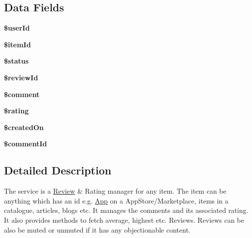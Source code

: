 \subsection*{Data Fields}
\begin{DoxyCompactItemize}
\item 
\hypertarget{class_review_a84651f4070d04080f6c5fd3c98cc9104}{{\bfseries \$user\+Id}}\label{class_review_a84651f4070d04080f6c5fd3c98cc9104}

\item 
\hypertarget{class_review_aa4c0908542b0acc0aaa0aadee3df7ae5}{{\bfseries \$item\+Id}}\label{class_review_aa4c0908542b0acc0aaa0aadee3df7ae5}

\item 
\hypertarget{class_review_a58391ea75f2d29d5d708d7050b641c33}{{\bfseries \$status}}\label{class_review_a58391ea75f2d29d5d708d7050b641c33}

\item 
\hypertarget{class_review_a20db85f30a58306b84a1edff65e1954e}{{\bfseries \$review\+Id}}\label{class_review_a20db85f30a58306b84a1edff65e1954e}

\item 
\hypertarget{class_review_a536677acc0163c53c067316a97456e6c}{{\bfseries \$comment}}\label{class_review_a536677acc0163c53c067316a97456e6c}

\item 
\hypertarget{class_review_a44118acf7e954a3bc096a4af6b059c23}{{\bfseries \$rating}}\label{class_review_a44118acf7e954a3bc096a4af6b059c23}

\item 
\hypertarget{class_review_a980da9bfdce6ade7abd3568e89f80013}{{\bfseries \$created\+On}}\label{class_review_a980da9bfdce6ade7abd3568e89f80013}

\item 
\hypertarget{class_review_a49916819068e77eb9292d7abd4136c54}{{\bfseries \$comment\+Id}}\label{class_review_a49916819068e77eb9292d7abd4136c54}

\end{DoxyCompactItemize}


\subsection{Detailed Description}
The service is a \hyperlink{class_review}{Review} \& Rating manager for any item. The item can be anything which has an id e.\+g. \hyperlink{class_app}{App} on a App\+Store/\+Marketplace, items in a catalogue, articles, blogs etc. It manages the comments and its associated rating. It also provides methods to fetch average, highest etc. Reviews. Reviews can be also be muted or unmuted if it has any objectionable content.


